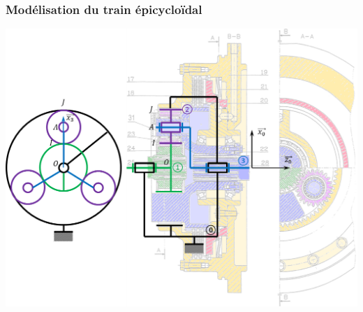 \documentclass[10pt,oneside]{article}
\begin{document}
\subsubsection{Modélisation du train épicycloïdal}
\begin{minipage}[c]{.9\linewidth}
\begin{center}
\includegraphics[width=\textwidth]{png/schema_epi}
\end{center}
\end{minipage}
\end{document}
